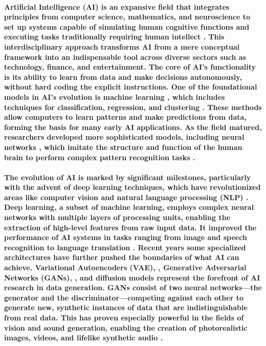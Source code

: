 \documentclass[11pt,a4paper,oneside]{report}
\begin{document}
\paragraph{Artificial Intelligence (AI) is an expansive field that integrates principles from computer science, mathematics, and neuroscience to set up systems capable of simulating human cognitive functions and executing tasks traditionally requiring human intellect \cite{russell2010artificial}. 
This interdisciplinary approach transforms AI from a mere conceptual framework into an indispensable tool across diverse sectors such as technology, finance, and entertainment. 
The core of AI's functionality is its ability to learn from data and make decisions autonomously, without hard coding the explicit instructions. 
One of the foundational models in AI's evolution is machine learning \cite{jordan2015machine}, which includes techniques for classification, regression, and clustering \cite{huang2022large}. 
These methods allow computers to learn patterns and make predictions from data, forming the basis for many early AI applications. 
As the field matured, researchers developed more sophisticated models, including neural networks \cite{abiodun2018state}, which imitate the structure and function of the human brain to perform complex pattern recognition tasks \cite{schmidhuber2015deep}.
}
\paragraph{The evolution of AI is marked by significant milestones, particularly with the advent of deep learning \cite{lecun2015deep} techniques, which have revolutionized areas like computer vision \cite{voulodimos2018deep} and natural language processing (NLP) \cite{chowdhary2020natural}. 
Deep learning, a subset of machine learning, employs complex neural networks with multiple layers of processing units, enabling the extraction of high-level features from raw input data. 
It improved the performance of AI systems in tasks ranging from image and speech recognition to language translation \cite{goodfellow2016deep}.
Recent years some specialized architectures have further pushed the boundaries of what AI can achieve. 
Variational Autoencoders (VAE), \cite{rezende2014stochastic, kingma2013auto}, Generative Adversarial Networks (GANs), \cite{goodfellow2014generative, vondrick2016generating, tulyakov2018mocogan, clark2019adversarial, brooks2022generating}, and diffusion models \cite{rombach2022high, ho2022imagen, blattmann2023align, gupta2023photorealistic} represent the forefront of AI research in data generation. 
GANs consist of two neural networks—the generator and the discriminator—competing against each other to generate new, synthetic instances of data that are indistinguishable from real data. 
This has proven especially powerful in the fields of vision and sound generation, enabling the creation of photorealistic images, videos, and lifelike synthetic audio \cite{granot2022drop}.
}
\end{document}
